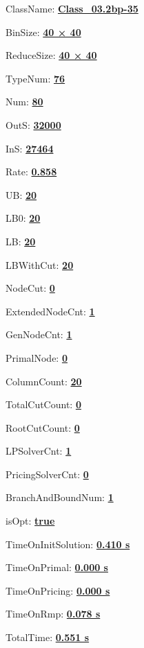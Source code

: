 \documentclass[11pt]{article}
\begin{document}
\pagestyle{empty}


ClassName: \underline{\textbf{Class_03.2bp-35}}
\par
BinSize: \underline{\textbf{40 × 40}}
\par
ReduceSize: \underline{\textbf{40 × 40}}
\par
TypeNum: \underline{\textbf{76}}
\par
Num: \underline{\textbf{80}}
\par
OutS: \underline{\textbf{32000}}
\par
InS: \underline{\textbf{27464}}
\par
Rate: \underline{\textbf{0.858}}
\par
UB: \underline{\textbf{20}}
\par
LB0: \underline{\textbf{20}}
\par
LB: \underline{\textbf{20}}
\par
LBWithCut: \underline{\textbf{20}}
\par
NodeCut: \underline{\textbf{0}}
\par
ExtendedNodeCnt: \underline{\textbf{1}}
\par
GenNodeCnt: \underline{\textbf{1}}
\par
PrimalNode: \underline{\textbf{0}}
\par
ColumnCount: \underline{\textbf{20}}
\par
TotalCutCount: \underline{\textbf{0}}
\par
RootCutCount: \underline{\textbf{0}}
\par
LPSolverCnt: \underline{\textbf{1}}
\par
PricingSolverCnt: \underline{\textbf{0}}
\par
BranchAndBoundNum: \underline{\textbf{1}}
\par
isOpt: \underline{\textbf{true}}
\par
TimeOnInitSolution: \underline{\textbf{0.410 s}}
\par
TimeOnPrimal: \underline{\textbf{0.000 s}}
\par
TimeOnPricing: \underline{\textbf{0.000 s}}
\par
TimeOnRmp: \underline{\textbf{0.078 s}}
\par
TotalTime: \underline{\textbf{0.551 s}}
\par
\newpage


\end{document}
